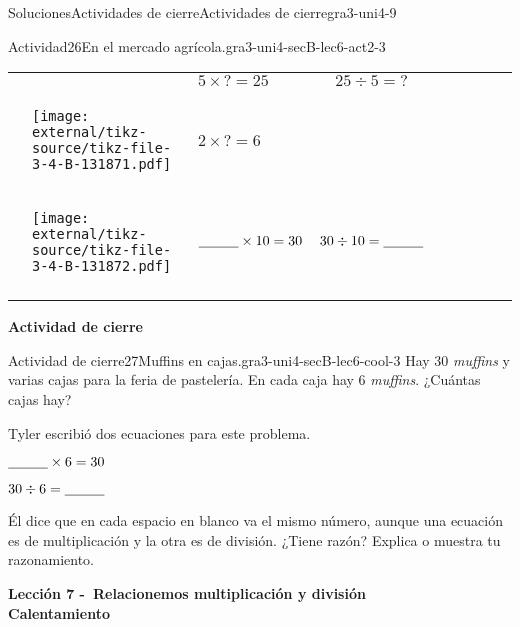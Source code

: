 \documentclass[twoside,10pt,]{article}
\newcommand{\hrulethin}  {\noalign{\hrule height 0.04em}}
\begin{document}
\begin{solutions-section}{Soluciones}{Actividades de cierre}{}{Actividades de cierre}{}{}{gra3-uni4-9}
\begin{activitysolution}{Actividad}{26}{En el mercado agrícola.}{gra3-uni4-secB-lec6-act2-3}
\begin{center}
{\begin{tabular}{AlAcAcAcA}
{}&&\(5 \times {?} = 25\)&\(25 \div 5 = {?}\)\tabularnewline\hrulethin
{}&\begin{image}{0}{1}{0}{}%
\texttt{[image: external/tikz-source/tikz-file-3-4-B-131871.pdf]}
\end{image}%
&\(2 \times{ ?} = 6\)&\tabularnewline\hrulethin
&\begin{image}{0}{1}{0}{}%
\texttt{[image: external/tikz-source/tikz-file-3-4-B-131872.pdf]}
\end{image}%
&\(\underline{\hspace{1 cm}} \times 10 = 30\)&\(30 \div 10 = \underline{\hspace{1 cm}}\)\tabularnewline\hrulethin
\end{tabular}
}%
\end{center}%
\end{activitysolution}%
\par\medskip
\noindent\textbf{\large{}\space\textperiodcentered\space{}Actividad de cierre}
\begin{projectsolution}{Actividad de cierre}{27}{Muffins en cajas.}{gra3-uni4-secB-lec6-cool-3}%
Hay 30 \emph{muffins} y varias cajas para la feria de pastelería. En cada caja hay 6 \emph{muffins}. ¿Cuántas cajas hay?%
\begin{sidebyside}{2}{0.05}{0.05}{0.1}%
\begin{sbspanel}{0.4}%
Tyler escribió dos ecuaciones para este problema.%
\end{sbspanel}%
\begin{sbspanel}{0.4}%
\(\underline{\hspace{1 cm}} \times 6 = 30\)%
\par
\(30 \div 6 = \underline{\hspace{1 cm}}\)%
\end{sbspanel}%
\end{sidebyside}%
\par
Él dice que en cada espacio en blanco va el mismo número, aunque una ecuación es de multiplicación y la otra es de división. ¿Tiene razón? Explica o muestra tu razonamiento.%
\end{projectsolution}%
\par\medskip
\noindent\textbf{\large{}\space\textperiodcentered\space{}Lección 7 -~Relacionemos multiplicación y división\\
\space\textperiodcentered\space{}Calentamiento}

\end{solutions-section}
\end{document}
